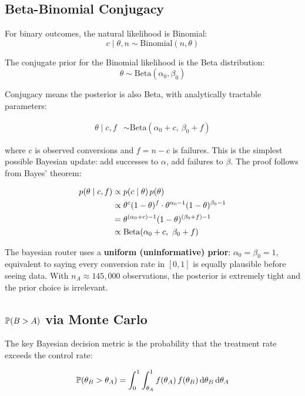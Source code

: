\subsection{Beta-Binomial Conjugacy}

For binary outcomes, the natural likelihood is Binomial:
\[
  c \mid \theta, n \sim \mathrm{Binomial}(n, \theta)
\]

The conjugate prior for the Binomial likelihood is the Beta distribution:
\[
  \theta \sim \mathrm{Beta}(\alpha_0, \beta_0)
\]

Conjugacy means the posterior is also Beta, with analytically tractable
parameters:

\begin{align}
  \theta \mid c, f &\sim \mathrm{Beta}(\alpha_0 + c,\ \beta_0 + f)
  \label{eq:beta-posterior}
\end{align}

where $c$ is observed conversions and $f = n - c$ is failures. This is the
simplest possible Bayesian update: add successes to $\alpha$, add failures to
$\beta$. The proof follows from Bayes' theorem:

\begin{align}
  p(\theta \mid c, f) &\propto p(c \mid \theta)\, p(\theta) \notag \\
  &\propto \theta^c (1-\theta)^f \cdot \theta^{\alpha_0 - 1}(1-\theta)^{\beta_0 - 1} \notag \\
  &= \theta^{(\alpha_0 + c) - 1}(1-\theta)^{(\beta_0 + f) - 1} \notag \\
  &\propto \mathrm{Beta}(\alpha_0 + c,\ \beta_0 + f)
\end{align}

The bayesian router uses a \textbf{uniform (uninformative) prior}:
$\alpha_0 = \beta_0 = 1$, equivalent to saying every conversion rate in $[0,1]$
is equally plausible before seeing data. With $n_A \approx 145{,}000$
observations, the posterior is extremely tight and the prior choice is
irrelevant.

\subsection{\texorpdfstring{$\operatorname{\mathbb{P}}(B > A)$}{P(B > A)} via Monte Carlo}

The key Bayesian decision metric is the probability that the treatment rate
exceeds the control rate:

\begin{equation}
  \operatorname{\mathbb{P}}(\theta_B > \theta_A) =
  \int_0^1 \int_{\theta_A}^{1}
    f(\theta_A)\, f(\theta_B)\,
  \mathrm{d}\theta_B\, \mathrm{d}\theta_A
  \label{eq:pbeatsa-integral}
\end{equation}

